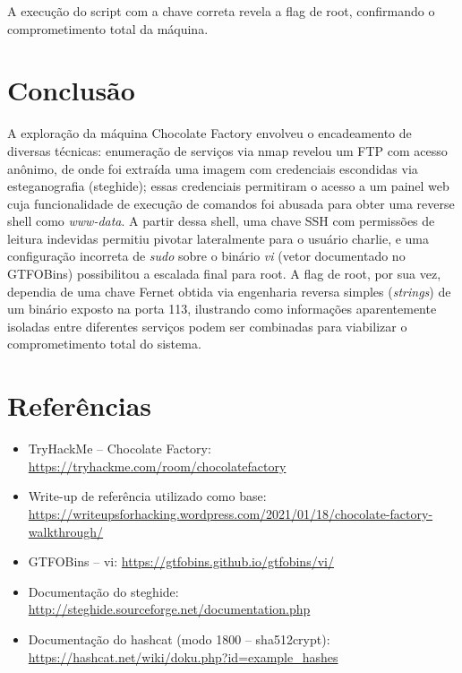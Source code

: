 \documentclass[12pt]{article} %
\begin{document}
A execução do script com a chave correta revela a flag de root, confirmando o comprometimento total da máquina.

\section{Conclusão}

A exploração da máquina Chocolate Factory envolveu o encadeamento de diversas técnicas: enumeração de serviços via nmap revelou um FTP com acesso anônimo, de onde foi extraída uma imagem com credenciais escondidas via esteganografia (steghide); essas credenciais permitiram o acesso a um painel web cuja funcionalidade de execução de comandos foi abusada para obter uma reverse shell como \textit{www-data}. A partir dessa shell, uma chave SSH com permissões de leitura indevidas permitiu pivotar lateralmente para o usuário charlie, e uma configuração incorreta de \textit{sudo} sobre o binário \textit{vi} (vetor documentado no GTFOBins) possibilitou a escalada final para root. A flag de root, por sua vez, dependia de uma chave Fernet obtida via engenharia reversa simples (\textit{strings}) de um binário exposto na porta 113, ilustrando como informações aparentemente isoladas entre diferentes serviços podem ser combinadas para viabilizar o comprometimento total do sistema.

\section{Referências}

\begin{itemize}
    \item TryHackMe -- Chocolate Factory: \url{https://tryhackme.com/room/chocolatefactory}
    \item Write-up de referência utilizado como base: \url{https://writeupsforhacking.wordpress.com/2021/01/18/chocolate-factory-walkthrough/}
    \item GTFOBins -- vi: \url{https://gtfobins.github.io/gtfobins/vi/}
    \item Documentação do steghide: \url{http://steghide.sourceforge.net/documentation.php}
    \item Documentação do hashcat (modo 1800 -- sha512crypt): \url{https://hashcat.net/wiki/doku.php?id=example_hashes}
\end{itemize}
\end{document}
